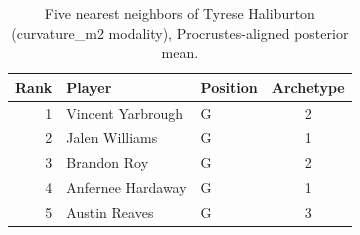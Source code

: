 \begin{table}[htbp]
  \centering\small
  \begin{tabular}{rllc}
    \toprule
    Rank & Player & Position & Archetype \\
    \midrule
    1 & Vincent Yarbrough & G & 2 \\
    2 & Jalen Williams & G & 1 \\
    3 & Brandon Roy & G & 2 \\
    4 & Anfernee Hardaway & G & 1 \\
    5 & Austin Reaves & G & 3 \\
    \bottomrule
  \end{tabular}
  \caption{Five nearest neighbors of Tyrese Haliburton (curvature_m2 modality), Procrustes-aligned posterior mean.}
  \label{tab:Tyrese_Haliburton_neighbors_curvature_m2}
\end{table}

